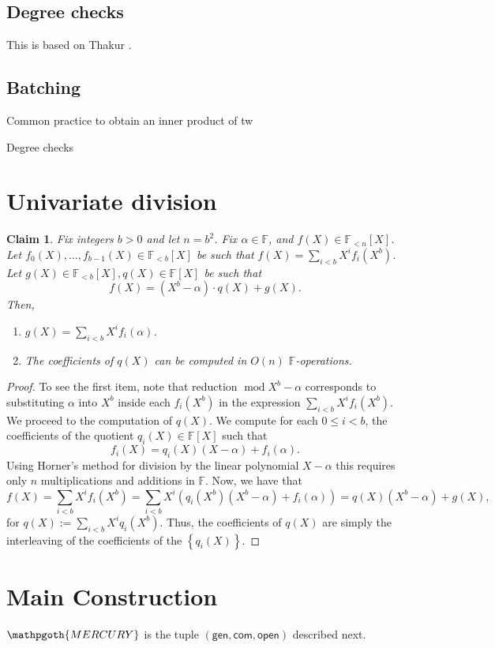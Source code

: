 \documentclass[11pt]{article} %
\newcommand{\mercury}{\ensuremath{\mathpgoth{MERCURY} }\xspace}
\newcommand{\F}{\ensuremath{\mathbb F}\xspace}
\newcommand{\com}{\ensuremath{\mathsf{com}}\xspace}
\newcommand{\open}{\ensuremath{\mathsf{open}}\xspace}
\newcommand{\defeq}{:=}
\renewcommand{\mod}{\ensuremath{\;\mathrm{mod}\;}}
\newcommand{\gen}{\ensuremath{\mathsf{gen}}\xspace}
\newcommand{\set}[1]{\ensuremath{\left\{#1\right\}}\xspace}
\newcommand{\polysofdeg}[1]{\ensuremath{\F_{< #1}[X]}\xspace}
\newcommand{\polys}{\ensuremath{\F[X]}\xspace}
\newcommand{\sumi}[1]{\sum_{i< #1}}
\newtheorem{claim}[lemma]{Claim}
\begin{document}
\subsection{Degree checks}
This is based on Thakur \cite{thakur}.

\subsection{Batching}
Common practice to obtain an inner product of tw

Degree checks 

\section{Univariate division}

\begin{claim}\label{clm:univariatemod}
 Fix integers $b>0$ and let $n=b^2$. Fix $\alpha\in \F$, and $f(X)\in \polysofdeg{n}$.
Let $f_0(X),\ldots,f_{b-1}(X)\in \polysofdeg{b}$ be such that
$f(X)=\sumi{b}X^i f_i(X^b)$.
 Let $g(X)\in \polysofdeg{b},q(X)\in \polys$ be such that 
 \[f(X)=(X^b-\alpha)\cdot q(X) + g(X).\]
 Then,
 \begin{enumerate}
  \item $g(X)=\sumi{b} X^i f_i(\alpha)$.
  \item The coefficients of $q(X)$ can be computed in $O(n)$ \F-operations.
 \end{enumerate}

\end{claim}
\begin{proof}
To see the first item, note that reduction $\mod X^b-\alpha$ corresponds to substituting $\alpha$ into $X^b$ inside each $f_i(X^b)$ in the expression $\sumi{b}X^i f_i(X^b)$.
We proceed to the computation of $q(X)$.
 We compute for each $0\leq i <b$, the coefficients of the quotient $q_i(X)\in \polys$ such that
\[f_i(X)=q_i(X)(X-\alpha)+ f_i(\alpha).\]
 Using Horner's method for division by the linear polynomial $X-\alpha$ this requires only $n$ multiplications and additions in \F.
Now, we have that
\[f(X)=\sumi{b}X^i f_i(X^b) = \sumi{b} X^i \left(q_i(X^b)(X^b-\alpha)+f_i(\alpha)\right)= q(X)(X^b-\alpha) + g(X),\]
for $q(X)\defeq \sumi{b}X^i q_i(X^b)$.
Thus, the coefficients of $q(X)$ are simply the interleaving of the coefficients of the \set{q_i(X)}.
\end{proof}


\section{Main Construction}
\mercury is the tuple $(\gen,\com,\open)$ described next. \\    
\end{document}
